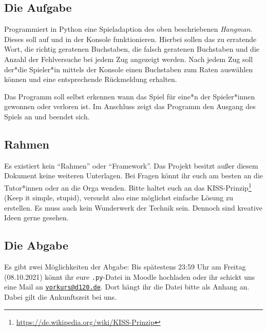 \documentclass[ngerman,accentcolor=3c,colorbacktitle,12pt]{tudaexercise}
\begin{document}
\subsection*{Die Aufgabe}
Programmiert in Python eine Spieladaption des oben beschriebenen \emph{Hangman}.
Dieses soll auf und in der Konsole funktionieren.
Hierbei sollen das zu erratende Wort, die richtig geratenen Buchstaben, die falsch geratenen Buchstaben und die Anzahl der Fehlversuche bei jedem Zug angezeigt werden.
Nach jedem Zug soll der*die Spieler*in mittels der Konsole einen Buchstaben zum Raten auswählen können und eine entsprechende Rückmeldung erhalten.

Das Programm soll selbst erkennen wann das Spiel für eine*n der Spieler*innen gewonnen oder verloren ist.
Im Anschluss zeigt das Programm den Ausgang des Spiels an und beendet sich.

\clearpage
\subsection*{Rahmen}
Es existiert kein \enquote{Rahmen} oder \enquote{Framework}.
Das Projekt besitzt außer diesem Dokument keine weiteren Unterlagen.
Bei Fragen könnt ihr euch am besten an die Tutor*innen oder an die Orga wenden.
Bitte haltet euch an das KISS-Prinzip\footnote[2]{\url{https://de.wikipedia.org/wiki/KISS-Prinzip}} (Keep it simple, stupid), versucht also eine möglichst einfache Lösung zu erstellen.
Es muss auch kein Wunderwerk der Technik sein.
Dennoch sind kreative Ideen gerne gesehen.

\subsection*{Die Abgabe}
Es gibt zwei Möglichkeiten der Abgabe: Bis spätestens 23:59 Uhr am Freitag (08.10.2021) könnt ihr eure \texttt{.py}-Datei in Moodle hochladen oder ihr schickt uns eine Mail an \href{mailto:vorkurs@d120.de}{\nolinkurl{vorkurs@d120.de}}.
Dort hängt ihr die Datei bitte als Anhang an.
Dabei gilt die Ankunftszeit bei uns.
\end{document}
